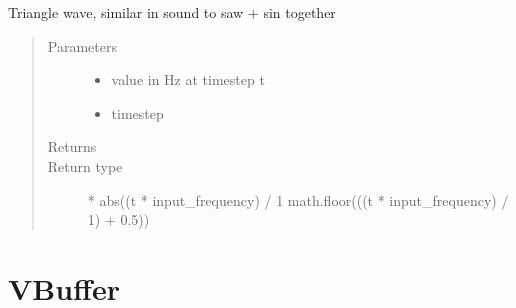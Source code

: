 \documentclass[letterpaper,10pt,english,openany,oneside]{sphinxmanual}
\begin{document}
\begin{fulllineitems}
\begin{fulllineitems}
\label{\detokenize{dpav:dpav.audio.wave_table.triangle}}
\sphinxAtStartPar
Triangle wave, similar in sound to saw + sin together
\begin{quote}\begin{description}
\item[{Parameters}] \leavevmode\begin{itemize}
\item {} 
\sphinxAtStartPar
{} \textendash{} value in Hz at timestep t

\item {} 
\sphinxAtStartPar
{} \textendash{} timestep

\end{itemize}

\item[{Returns}] \leavevmode
\sphinxAtStartPar


\item[{Return type}] \leavevmode
{} * abs((t * input\_frequency) / 1 \sphinxhyphen{} math.floor(((t * input\_frequency) / 1) + 0.5))

\end{description}\end{quote}

\end{fulllineitems}


\end{fulllineitems}



\section{VBuffer}
\label{\detokenize{dpav:module-dpav.vbuffer}}\label{\detokenize{dpav:vbuffer}}
\end{document}
